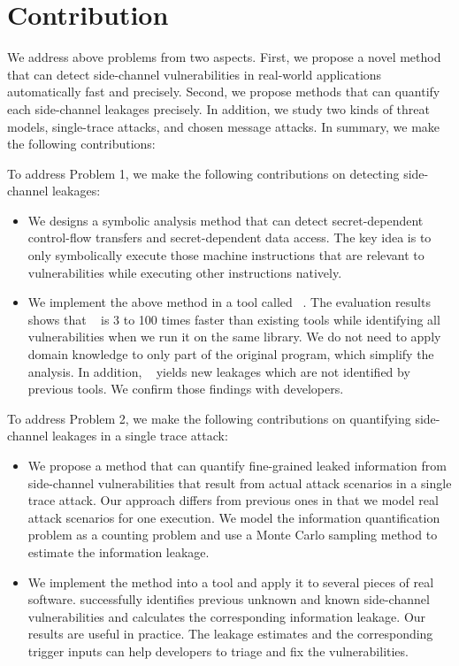 \section{Contribution}
We address above problems from two aspects. First, we propose a novel method that can detect side-channel vulnerabilities in real-world applications automatically fast and precisely. Second, we propose methods that can quantify each side-channel leakages precisely. In addition, we study two kinds of threat models, single-trace attacks, and chosen message attacks. In summary, we make the following contributions:

To address Problem 1, we make the following contributions on detecting side-channel leakages:

\begin{itemize}
    \item We designs a symbolic analysis method that can detect secret-dependent control-flow transfers and secret-dependent data access. The key idea is to only symbolically execute those machine instructions that are relevant to vulnerabilities while executing other instructions natively.
    \item We implement the above method in a tool called ~\detect{}. The evaluation results shows that ~\detect{}  is 3 to 100 times faster than existing tools while identifying all vulnerabilities when we run it on the same library.  We do not need to apply domain knowledge to only part of the original program, which simplify the analysis. In addition, ~\detect{} yields new leakages which are not identified by previous tools. We confirm those findings with developers.
\end{itemize}

To address Problem 2, we make the following contributions on quantifying side-channel leakages in a single trace attack:


\begin{itemize}
    \item We propose a method that can quantify fine-grained leaked
    information from side-channel vulnerabilities that result from actual attack
    scenarios in a single trace attack. Our approach differs from previous ones in that we
    model real attack scenarios for one execution. 
    We model the information quantification problem as a counting problem 
    and use a Monte Carlo sampling method to estimate the information leakage.
    \item We implement the method into a tool and apply it
    to several pieces of real software. \tool{} successfully identifies
    previous unknown and known side-channel vulnerabilities and calculates the corresponding information leakage. 
    Our results are useful in practice.
    The leakage estimates and the corresponding trigger inputs can 
    help developers to triage and fix the vulnerabilities.
\end{itemize}

